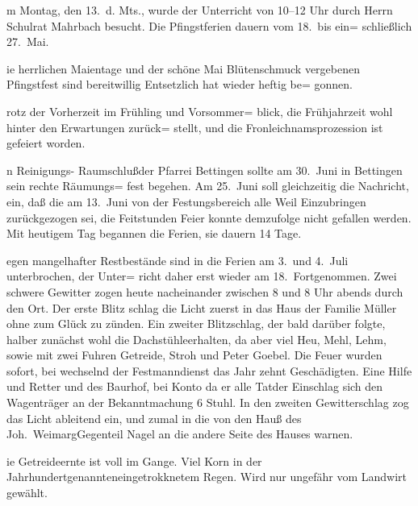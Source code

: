 

%
m Montag, den 13.\ d. Mts., wurde der Unterricht\ob
von 10--12 Uhr durch Herrn Schulrat Mahrbach besucht.\ob
Die Pfingstferien dauern vom 18.\ bis ein=\ob
schließlich 27.\ Mai.

%
ie herrlichen Maientage und der schöne\ob
Mai Blütenschmuck vergebenen Pfingstfest\ob
sind bereitwillig Entsetzlich hat wieder heftig be=\ob
gonnen.

%
rotz der Vorherzeit im Frühling und Vorsommer=\ob
blick, die Frühjahrzeit wohl hinter den Erwartungen zurück=\ob
stellt, und die Fronleichnamsprozession ist gefeiert worden.

%
n Reinigungs- Raumschluß\unsicher der Pfarrei Bettingen\ob
sollte am 30.\ Juni in Bettingen sein rechte Räumungs=\ob
fest begehen. Am 25.\ Juni soll gleichzeitig die Nachricht,\ob
ein, daß die am 13.\ Juni von der Festungsbereich\ob
alle Weil Einzubringen zurückgezogen sei, die Feitstunden\unsicher\ob
Feier konnte demzufolge nicht gefallen werden.\ob
Mit heutigem Tag begannen die Ferien, sie\ob
dauern 14 Tage.

%
egen mangelhafter Restbestände sind in die\ob
Ferien am 3.\ und 4.\ Juli unterbrochen, der Unter=\ob
richt daher erst wieder am 18.\ Fortgenommen.\ob
Zwei schwere Gewitter zogen heute nacheinander\ob
zwischen 8 und 8 Uhr abends durch den Ort. Der erste\ob
Blitz schlag die Licht zuerst in das Haus der Familie\ob
Müller ohne zum Glück zu zünden. Ein zweiter\ob
Blitzschlag, der bald darüber folgte, halber zunächst\ob
wohl die Dachstühle\unsicher erhalten, da aber viel Heu, Mehl, Lehm,\ob
sowie mit zwei Fuhren Getreide, Stroh und\ob
Peter Goebel. Die Feuer wurden sofort, bei wechselnd\ob
der Festmanndienst das Jahr zehnt Geschädigten. Eine\ob
Hilfe und Retter und des Baurhof,\unsicher{} bei Konto\ob
da er alle Tat\unsicher der Einschlag sich den Wagenträger\ob
an der Bekanntmachung 6 Stuhl. In den zweiten\ob
Gewitterschlag zog das Licht ableitend ein, und zumal\ob
in die von den Hauß des Joh.\ Weimarg\unsicher Gegenteil\unsicher\ob
Nagel an die andere Seite des Hauses warnen.

%
ie Getreideernte ist voll im Gange. Viel Korn\ob
in der Jahrhundertgenannten\unsicher eingetrokknetem Regen. Wird\ob
nur ungefähr vom Landwirt gewählt\unsicher.
\pend
